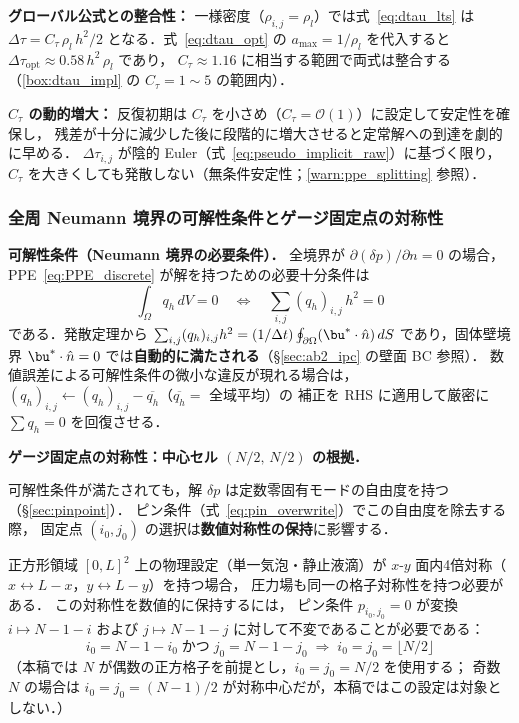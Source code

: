 \textbf{グローバル公式との整合性：}
一様密度（$\rho_{i,j} = \rho_l$）では式~\eqref{eq:dtau_lts} は
$\Delta\tau = C_\tau\,\rho_l\,h^2/2$ となる．式~\eqref{eq:dtau_opt} の $a_\mathrm{max} = 1/\rho_l$ を代入すると
$\Delta\tau_\mathrm{opt} \approx 0.58\,h^2\,\rho_l$ であり，
$C_\tau \approx 1.16$ に相当する範囲で両式は整合する（\ref{box:dtau_impl} の $C_\tau = 1 \sim 5$ の範囲内）．

\textbf{$C_\tau$ の動的増大：}
反復初期は $C_\tau$ を小さめ（$C_\tau = \mathcal{O}(1)$）に設定して安定性を確保し，
残差が十分に減少した後に段階的に増大させると定常解への到達を劇的に早める．
$\Delta\tau_{i,j}$ が陰的 Euler（式~\eqref{eq:pseudo_implicit_raw}）に基づく限り，
$C_\tau$ を大きくしても発散しない（無条件安定性；\ref{warn:ppe_splitting} 参照）．

\subsubsection{全周 Neumann 境界の可解性条件とゲージ固定点の対称性}
\label{sec:ppe_gauge_neumann}

\noindent\textbf{可解性条件（Neumann 境界の必要条件）．}
全境界が $\partial(\delta p)/\partial n = 0$ の場合，
PPE~\eqref{eq:PPE_discrete} が解を持つための必要十分条件は
\begin{equation}
  \int_\Omega q_h \, dV = 0
  \quad\Longleftrightarrow\quad
  \sum_{i,j}(q_h)_{i,j}\,h^2 = 0
  \label{eq:neumann_solvability}
\end{equation}
である．発散定理から
$\sum_{i,j}(q_h)_{i,j}h^2 = (1/\Delta t)\oint_{\partial\Omega}(\bu^*\cdot\hat{n})\,dS$
であり，固体壁境界 $\bu^*\cdot\hat{n}=0$ では\textbf{自動的に満たされる}（§\ref{sec:ab2_ipc} の壁面 BC 参照）．
数値誤差による可解性条件の微小な違反が現れる場合は，
$(q_h)_{i,j} \leftarrow (q_h)_{i,j} - \overline{q_h}$（$\overline{q_h} = $ 全域平均）の
補正を RHS に適用して厳密に $\sum q_h = 0$ を回復させる．

\medskip
\noindent\textbf{ゲージ固定点の対称性：中心セル $(N/2,\,N/2)$ の根拠．}

可解性条件が満たされても，解 $\delta p$ は定数零固有モードの自由度を持つ（§\ref{sec:pinpoint}）．
ピン条件（式~\eqref{eq:pin_overwrite}）でこの自由度を除去する際，
固定点 $(i_0,j_0)$ の選択は\textbf{数値対称性の保持}に影響する．

正方形領域 $[0,L]^2$ 上の物理設定（単一気泡・静止液滴）が
$x$-$y$ 面内4倍対称（$x\leftrightarrow L-x$，$y\leftrightarrow L-y$）を持つ場合，
圧力場も同一の格子対称性を持つ必要がある．
この対称性を数値的に保持するには，
ピン条件 $p_{i_0,j_0}=0$ が変換 $i\mapsto N-1-i$ および $j\mapsto N-1-j$ に対して不変であることが必要である：
\[
  i_0 = N-1-i_0 \;\text{かつ}\; j_0 = N-1-j_0
  \;\Longrightarrow\;
  i_0 = j_0 = \bigl\lfloor N/2 \bigr\rfloor
\]
（本稿では $N$ が偶数の正方格子を前提とし，$i_0=j_0=N/2$ を使用する；
奇数 $N$ の場合は $i_0=j_0=(N-1)/2$ が対称中心だが，本稿ではこの設定は対象としない．）

